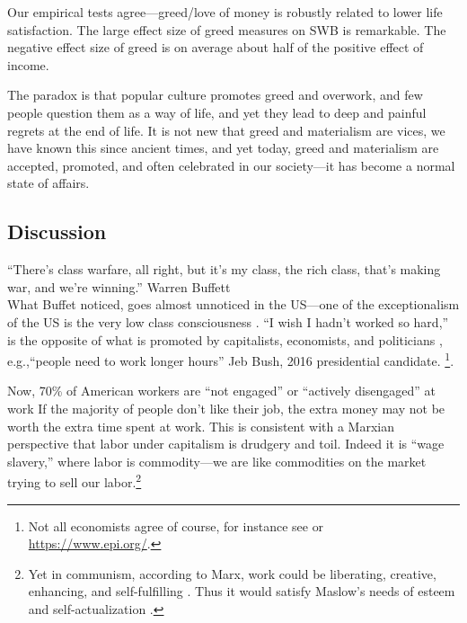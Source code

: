 \documentclass[10pt, letterpaper]{article}
\begin{document}
\begin{spacing}{1.8}
Our empirical tests agree---greed/love of money is
robustly related to lower life satisfaction. The large effect size of greed measures on SWB is remarkable. The negative effect size of greed is on average about half of the positive effect of income.

The paradox is that popular culture promotes greed and overwork, and few people question them as a way of life, and yet they lead to deep and painful regrets at the end of life.
%
 It is not new that greed and materialism are vices, we have known this since ancient times, and yet today, greed and materialism are accepted, promoted, and often celebrated in our society---it has become a normal state of affairs. 
 

\subsection{Discussion}

``There's class warfare, all right, but it's my class, the rich class, that's making war, and we're winning.'' Warren Buffett\\

What Buffet noticed, goes almost unnoticed in the US---one of the exceptionalism of the US is the very low class consciousness \citep{lipset97, lipset00}.
%
%
``I wish I hadn't worked so hard,''  is the opposite of  what is promoted by capitalists, economists, and politicians \cite{wang11b,wight2005adam}, e.g.,``people need to work longer hours'' Jeb Bush, 2016 presidential candidate\citep{smithABC15jul8}. \footnote{Not all economists agree of course,
  for instance see \citet{wight2005adam} or \url{https://www.epi.org/}.}.
 


Now, 70\% of American workers are ``not engaged'' or ``actively disengaged'' at work \citep[][]{harvey14}
If the majority of people don't like their job, the extra money may not be worth
the extra time spent at work. This is consistent with a Marxian perspective that
labor under capitalism is drudgery and toil. Indeed it is ``wage slavery,''
where labor is commodity---we are like commodities on the market trying to sell
our labor.\footnote{Yet in communism, according to Marx, work could be
  liberating, creative, enhancing, and self-fulfilling \citep{spencer20}. Thus
  it would satisfy Maslow's needs of esteem and self-actualization \citep{maslow87}.} 


\end{spacing}
\end{document}
